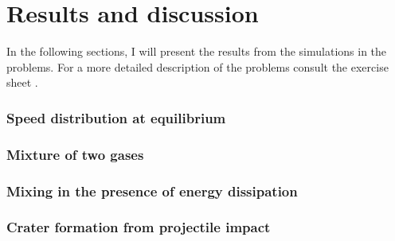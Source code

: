 
\newpage
\part{Results and discussion}

In the following sections, I will present the results from the simulations in the problems. For a more detailed description of the problems consult the exercise sheet \cite{sheet}.

\section{Speed distribution at equilibrium}\label{sec:eq}



\section{Mixture of two gases}\label{sec:mix1}



\section{Mixing in the presence of energy dissipation}\label{sec:mix2}



\section{Crater formation from projectile impact}\label{sec:crater}



\newpage







